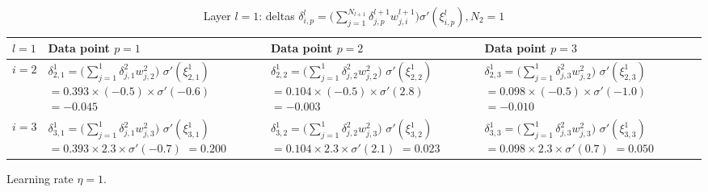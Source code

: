 \begin{table}[h!]
    \centering
    \begin{tabular}{|m{1cm}|p{4cm}|p{4cm}|p{4cm}|}
        \hline
        \centering $l = 1$ &
        Data point $p = 1$ &
        Data point $p = 2$ &
        Data point $p = 3$ \\
        \hline
        \centering $i = 2$ &

        $\delta_{2, 1}^1 = \Big( \sum_{j=1}^1{ \delta_{j, 1}^2 w_{j, 2}^2 } \Big)$
        $\sigma'(\xi_{2, 1}^1)$
        $= 0.393 \times (-0.5) \times \sigma'(-0.6)$
        $= -0.045$ &

        $\delta_{2, 2}^1 = \Big( \sum_{j=1}^1{ \delta_{j, 2}^2 w_{j, 2}^2 } \Big)$
        $\sigma'(\xi_{2, 2}^1)$
        $= 0.104 \times (-0.5) \times \sigma'(2.8)$
        $= -0.003$ &

        $\delta_{2, 3}^1 = \Big( \sum_{j=1}^1{ \delta_{j, 3}^2 w_{j, 2}^2 } \Big)$
        $\sigma'(\xi_{2, 3}^1)$
        $= 0.098 \times (-0.5) \times \sigma'(-1.0)$
        $= -0.010$ \\
        \hline
        \centering $i = 3$ &

        $\delta_{3, 1}^1 = \Big( \sum_{j=1}^1{ \delta_{j, 1}^2 w_{j, 3}^2 } \Big)$
        $\sigma'(\xi_{3, 1}^1)$
        $= 0.393 \times 2.3 \times \sigma'(-0.7)$
        $= 0.200$ &

        $\delta_{3, 2}^1 = \Big( \sum_{j=1}^1{ \delta_{j, 2}^2 w_{j, 3}^2 } \Big)$
        $\sigma'(\xi_{3, 2}^1)$
        $= 0.104 \times 2.3 \times \sigma'(2.1)$
        $= 0.023$ &

        $\delta_{3, 3}^1 = \Big( \sum_{j=1}^1{ \delta_{j, 3}^2 w_{j, 3}^2 } \Big)$
        $\sigma'(\xi_{3, 3}^1)$
        $= 0.098 \times 2.3 \times \sigma'(0.7)$
        $= 0.050$ \\
        \hline
    \end{tabular}
\caption{Layer $l = 1$: deltas $\delta_{i, p}^l = \Big( \sum_{j=1}^{N_{l+1}}{ \delta_{j, p}^{l+1} w_{j, i}^{l+1} } \Big) \sigma'(\xi_{i, p}^l), N_2 = 1$}
\label{table:layer1-delta}
\end{table}

\newpage

Learning rate $\eta = 1$.

